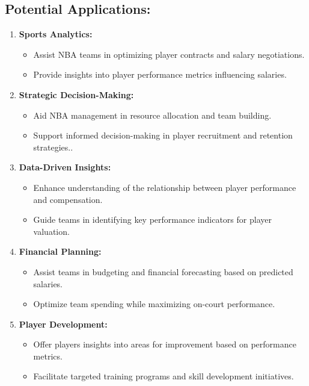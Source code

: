 \documentclass{article}
\begin{document}
\subsection*{Potential Applications:}
\begin{enumerate}
    \item \textbf{Sports Analytics:}
    \begin{itemize}
        \item Assist NBA teams in optimizing player contracts and salary negotiations.
        \item Provide insights into player performance metrics influencing salaries.
    \end{itemize}
    
    \item \textbf{Strategic Decision-Making:}
    \begin{itemize}
        \item Aid NBA management in resource allocation and team building.
        \item Support informed decision-making in player recruitment and retention strategies..
    \end{itemize}
    
    \item \textbf{Data-Driven Insights:}
    \begin{itemize}
        \item Enhance understanding of the relationship between player performance and compensation.
        \item Guide teams in identifying key performance indicators for player valuation.
    \end{itemize}

    \item \textbf{Financial Planning:}
    \begin{itemize}
        \item Assist teams in budgeting and financial forecasting based on predicted salaries.
        \item Optimize team spending while maximizing on-court performance.
    \end{itemize}

    \item \textbf{Player Development:}
    \begin{itemize}
        \item Offer players insights into areas for improvement based on performance metrics.
        \item Facilitate targeted training programs and skill development initiatives.
    \end{itemize}  
\end{enumerate}
\end{document}
